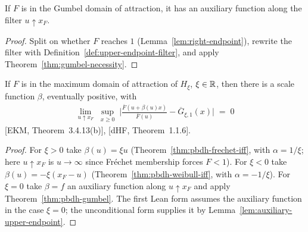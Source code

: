 \begin{lemma}
  \label{lem:auxiliary-upper-endpoint}
  \leanok
  If $F$ is in the Gumbel domain of attraction, it has an auxiliary function along the filter
  $u \uparrow x_F$.
\end{lemma}
\begin{proof}
  \leanok
  Split on whether $F$ reaches $1$ (Lemma~\ref{lem:right-endpoint}), rewrite the filter with
  Definition~\ref{def:upper-endpoint-filter}, and apply Theorem~\ref{thm:gumbel-necessity}.
\end{proof}

\begin{theorem}
  \label{thm:pbdh-general}
  \leanok
  If $F$ is in the maximum domain of attraction of $H_\xi$, $\xi \in \mathbb{R}$, then there is a scale
  function $\beta$, eventually positive, with
  \begin{align*}
    \lim_{u \uparrow x_F} \; \sup_{x \ge 0} \; \Big| \frac{\overline{F}(u + \beta(u) x)}{\overline{F}(u)}
      - \overline{G}_{\xi, 1}(x) \Big| \; = \; 0
  \end{align*}
  [EKM, Theorem~3.4.13(b)], [dHF, Theorem~1.1.6].
\end{theorem}
\begin{proof}
  \leanok
  For $\xi > 0$ take $\beta(u) = \xi u$ (Theorem~\ref{thm:pbdh-frechet-iff}, with
  $\alpha = 1/\xi$; here $u \uparrow x_F$ is $u \to \infty$ since Fréchet membership forces
  $F < 1$). For $\xi < 0$ take $\beta(u) = -\xi (x_F - u)$ (Theorem~\ref{thm:pbdh-weibull-iff},
  with $\alpha = -1/\xi$). For $\xi = 0$ take $\beta = f$ an auxiliary function along
  $u \uparrow x_F$ and apply Theorem~\ref{thm:pbdh-gumbel}. The first Lean form assumes the
  auxiliary function in the case $\xi = 0$; the unconditional form supplies it by
  Lemma~\ref{lem:auxiliary-upper-endpoint}.
\end{proof}

